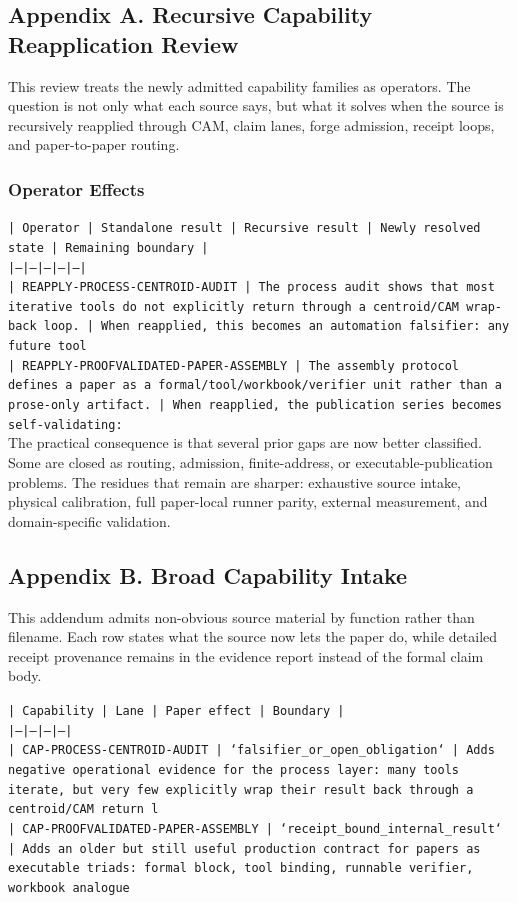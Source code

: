 \documentclass[11pt]{article}
\begin{document}
\subsection*{Appendix A. Recursive Capability Reapplication Review}

This review treats the newly admitted capability families as operators. The question is not only what each source says, but what it solves when the source is recursively reapplied through CAM, claim lanes, forge admission, receipt loops, and paper-to-paper routing.

\subsubsection*{Operator Effects}

\noindent\texttt{| Operator | Standalone result | Recursive result | Newly resolved state | Remaining boundary |}\\
\noindent\texttt{|---|---|---|---|---|}\\
\noindent\texttt{| REAPPLY-PROCESS-CENTROID-AUDIT | The process audit shows that most iterative tools do not explicitly return through a centroid/CAM wrap-back loop. | When reapplied, this becomes an automation falsifier: any future tool}\\
\noindent\texttt{| REAPPLY-PROOFVALIDATED-PAPER-ASSEMBLY | The assembly protocol defines a paper as a formal/tool/workbook/verifier unit rather than a prose-only artifact. | When reapplied, the publication series becomes self-validating:}\\

The practical consequence is that several prior gaps are now better classified. Some are closed as routing, admission, finite-address, or executable-publication problems. The residues that remain are sharper: exhaustive source intake, physical calibration, full paper-local runner parity, external measurement, and domain-specific validation.

\subsection*{Appendix B. Broad Capability Intake}

This addendum admits non-obvious source material by function rather than filename. Each row states what the source now lets the paper do, while detailed receipt provenance remains in the evidence report instead of the formal claim body.

\noindent\texttt{| Capability | Lane | Paper effect | Boundary |}\\
\noindent\texttt{|---|---|---|---|}\\
\noindent\texttt{| CAP-PROCESS-CENTROID-AUDIT | `falsifier\_or\_open\_obligation` | Adds negative operational evidence for the process layer: many tools iterate, but very few explicitly wrap their result back through a centroid/CAM return l}\\
\noindent\texttt{| CAP-PROOFVALIDATED-PAPER-ASSEMBLY | `receipt\_bound\_internal\_result` | Adds an older but still useful production contract for papers as executable triads: formal block, tool binding, runnable verifier, workbook analogue}\\
\end{document}
